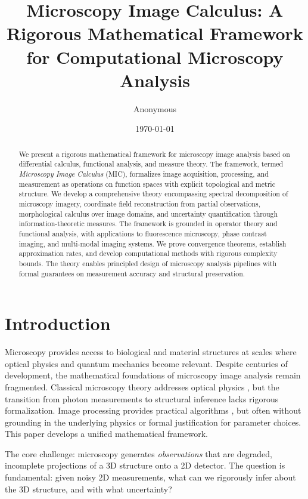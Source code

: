\documentclass[twocolumn,11pt]{article}
\title{Microscopy Image Calculus: A Rigorous Mathematical Framework for Computational Microscopy Analysis}
\author{Anonymous}
\date{\today}
\begin{document}
\maketitle

\begin{abstract}
We present a rigorous mathematical framework for microscopy image analysis based on differential calculus, functional analysis, and measure theory. The framework, termed \textit{Microscopy Image Calculus} (MIC), formalizes image acquisition, processing, and measurement as operations on function spaces with explicit topological and metric structure. We develop a comprehensive theory encompassing spectral decomposition of microscopy imagery, coordinate field reconstruction from partial observations, morphological calculus over image domains, and uncertainty quantification through information-theoretic measures. The framework is grounded in operator theory and functional analysis, with applications to fluorescence microscopy, phase contrast imaging, and multi-modal imaging systems. We prove convergence theorems, establish approximation rates, and develop computational methods with rigorous complexity bounds. The theory enables principled design of microscopy analysis pipelines with formal guarantees on measurement accuracy and structural preservation.
\end{abstract}

\section{Introduction}

Microscopy provides access to biological and material structures at scales where optical physics and quantum mechanics become relevant. Despite centuries of development, the mathematical foundations of microscopy image analysis remain fragmented. Classical microscopy theory addresses optical physics \cite{Born1980, Goodman2005}, but the transition from photon measurements to structural inference lacks rigorous formalization. Image processing provides practical algorithms \cite{Gonzalez2018}, but often without grounding in the underlying physics or formal justification for parameter choices. This paper develops a unified mathematical framework.

The core challenge: microscopy generates \textit{observations} that are degraded, incomplete projections of a 3D structure onto a 2D detector. The question is fundamental: given noisy 2D measurements, what can we rigorously infer about the 3D structure, and with what uncertainty?
\end{document}
